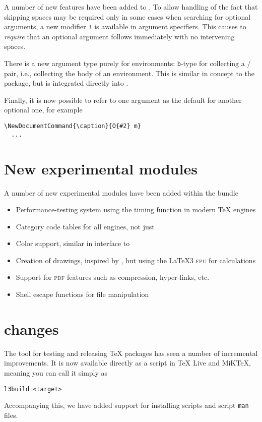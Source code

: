 \documentclass{ltnews}
\begin{document}
A number of new features have been added to . To allow
handling of the fact that skipping spaces may be required only in
some cases when searching for optional arguments, a new modifier
\texttt{!} is available in argument specifiers. This causes
 to \emph{require} that an optional argument follows
immediately with no intervening spaces.

There is a new argument type purely for environments: \texttt{b}-type
for collecting a / pair, i.e., collecting the body of
an environment. This is similar in concept to the  package,
but is integrated directly into .

Finally, it is now possible to refer to one argument as the
default for another optional one, for example
\begin{verbatim}
\NewDocumentCommand{\caption}{O{#2} m}
  ...
\end{verbatim}

\section{New experimental modules}

A number of new experimental modules have been added within the
 bundle
\begin{itemize}
  \item {} Performance-testing system using the timing
    function in modern \TeX{} engines
  \item {} Category code tables for all engines, not
    just 
  \item {} Color support, similar in interface to 
  \item {} Creation of drawings, inspired by , but
    using the \LaTeX3 \textsc{fpu} for calculations
  \item {} Support for \textsc{pdf} features such as compression,
    hyper-links, etc.
  \item {} Shell escape functions for file manipulation
\end{itemize}

\section{ changes}

The  tool for testing and releasing \TeX{} packages
has seen a number of incremental improvements. It is now available directly
as a script in \TeX{} Live and MiK\TeX{}, meaning you can call it simply
as
\begin{verbatim}
l3build <target>
\end{verbatim}
Accompanying this, we have added support for installing scripts and script
\texttt{man} files.
\end{document}

